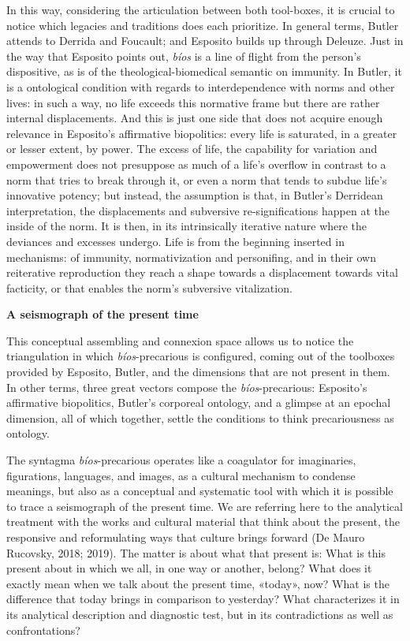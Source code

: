 \documentclass[a4paper,]{scrartcl}
\begin{document}
In this way, considering the articulation between both tool-boxes, it is
crucial to notice which legacies and traditions does each prioritize. In
general terms, Butler attends to Derrida and Foucault; and Esposito
builds up through Deleuze. Just in the way that Esposito points out,
\emph{bíos} is a line of flight from the person's dispositive, as is of
the theological-biomedical semantic on immunity. In Butler, it is a
ontological condition with regards to interdependence with norms and
other lives: in such a way, no life exceeds this normative frame but
there are rather internal displacements. And this is just one side that
does not acquire enough relevance in Esposito's affirmative biopolitics:
every life is saturated, in a greater or lesser extent, by power. The
excess of life, the capability for variation and empowerment does not
presuppose as much of a life's overflow in contrast to a norm that tries
to break through it, or even a norm that tends to subdue life's
innovative potency; but instead, the assumption is that, in Butler's
Derridean interpretation, the displacements and subversive
re-significations happen at the inside of the norm. It is then, in its
intrinsically iterative nature where the deviances and excesses undergo.
Life is from the beginning inserted in mechanisms: of immunity,
normativization and personifing, and in their own reiterative
reproduction they reach a shape towards a displacement towards vital
facticity, or that enables the norm's subversive vitalization.

\textbf{A seismograph of the present time}

This conceptual assembling and connexion space allows us to notice the
triangulation in which \emph{bíos}-precarious is configured, coming out
of the toolboxes provided by Esposito, Butler, and the dimensions that
are not present in them. In other terms, three great vectors compose the
\emph{bíos}-precarious: Esposito's affirmative biopolitics, Butler's
corporeal ontology, and a glimpse at an epochal dimension, all of which
together, settle the conditions to think precariousness as ontology.

The syntagma \emph{bíos}-precarious operates like a coagulator for
imaginaries, figurations, languages, and images, as a cultural mechanism
to condense meanings, but also as a conceptual and systematic tool with
which it is possible to trace a seismograph of the present time. We are
referring here to the analytical treatment with the works and cultural
material that think about the present, the responsive and reformulating
ways that culture brings forward (De Mauro Rucovsky, 2018; 2019). The
matter is about what that present is: What is this present about in
which we all, in one way or another, belong? What does it exactly mean
when we talk about the present time, «today», now? What is the
difference that today brings in comparison to yesterday? What
characterizes it in its analytical description and diagnostic test, but
in its contradictions as well as confrontations?
\end{document}
